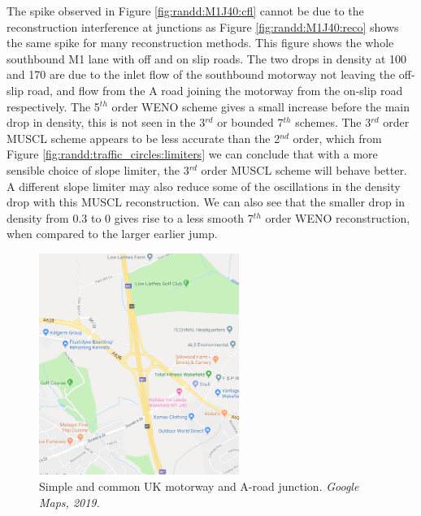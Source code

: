 	The spike observed in Figure \ref{fig:randd:M1J40:cfl} cannot be due to the reconstruction interference at junctions as Figure \ref{fig:randd:M1J40:reco} shows the same spike for many reconstruction methods. This figure shows the whole southbound M1 lane with off and on slip roads. The two drops in density at 100 and 170 are due to the inlet flow of the southbound motorway not leaving the off-slip road, and flow from the A road joining the motorway from the on-slip road respectively. The 5$^{th}$ order WENO scheme gives a small increase before the main drop in density, this is not seen in the 3$^{rd}$ or bounded 7$^{th}$ schemes. The 3$^{rd}$ order MUSCL scheme appears to be less accurate than the 2$^{nd}$ order, which from Figure \ref{fig:randd:traffic_circles:limiters} we can conclude that with a more sensible choice of slope limiter, the 3$^{rd}$ order MUSCL scheme will behave better. A different slope limiter may also reduce some of the oscillations in the density drop with this MUSCL reconstruction. We can also see that the smaller drop in density from 0.3 to 0 gives rise to a less smooth 7$^{th}$ order WENO reconstruction, when compared to the larger earlier jump. 
	
	\begin{figure}
    		\centering
        		\includegraphics[trim=0 0 0 0,clip,width=0.58\textwidth]{M1J40.png}
		\caption[Wakefield M1J40 : Junction area map]{Simple and common UK motorway and A-road junction. \emph{Google Maps, 2019.}}
		\label{fig:randd:M1J40:map}
	\end{figure}

